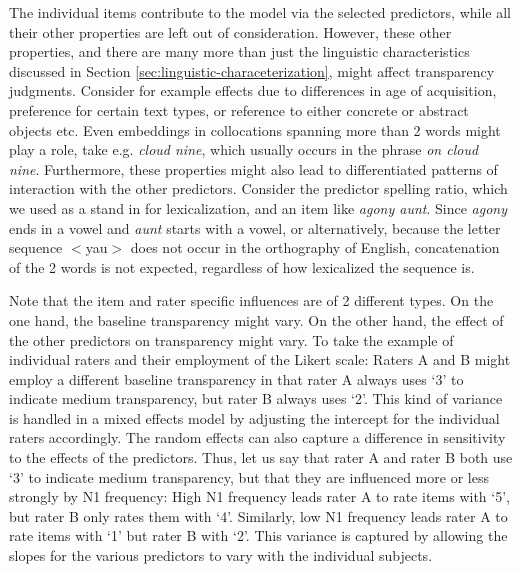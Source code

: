 The individual items contribute to the model via the selected
predictors, while all their other properties are left out of
consideration. However, these other properties, and there are many
more than just the linguistic characteristics discussed in Section
\ref{sec:linguistic-characeterization}, might 
affect transparency judgments. Consider for
example effects due to differences in age of acquisition, preference
for certain text types, or reference to either concrete or abstract
objects etc. Even embeddings in collocations spanning more than 2
words might play a role, take e.g. \emph{cloud nine}, which usually
occurs in the phrase \emph{on cloud nine}. Furthermore, these
properties might also lead to differentiated patterns of interaction
with the other predictors. Consider the predictor spelling ratio,
which we used as a stand in for lexicalization, and an item like
\emph{agony aunt}. Since \emph{agony} ends in a vowel and \emph{aunt}
starts with a vowel, or alternatively, because the letter sequence
$<$yau$>$ does not occur in the orthography of English, concatenation
of the 2 words is not expected, regardless of how lexicalized the
sequence is.

Note that the item and rater specific influences are of 2 different
types. On the one hand, the baseline transparency might vary. On the
other hand, the effect of the other predictors on transparency might
vary. To take the example of individual raters and their employment of
the Likert scale: Raters A and B might employ a different baseline
transparency in that rater A always uses `3' to indicate medium
transparency, but rater B always uses `2'. This kind of variance is
handled in a mixed effects model by adjusting the intercept for the
individual raters accordingly. The random effects can also capture a
difference in sensitivity to the effects of the predictors. Thus, let us say that
rater A and rater B both use `3' to indicate medium transparency, but
that they are influenced more or less strongly by N1 frequency: High
N1 frequency leads rater A to rate items with `5', but rater B only
rates them with `4'. Similarly, low N1 frequency leads rater A to rate
items with `1' but rater B with `2'. This variance is captured by
allowing the slopes for the various
predictors to vary with the individual subjects.

